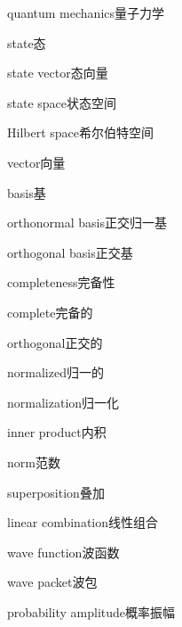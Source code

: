 \begin{multicols}{2}
\raggedright
\setlength{\parindent}{0pt}
\setlength{\parskip}{0.16em}
\linespread{1.02}\selectfont
quantum mechanics\hspace{0.9em}量子力学\par
state\hspace{0.9em}态\par
state vector\hspace{0.9em}态向量\par
state space\hspace{0.9em}状态空间\par
Hilbert space\hspace{0.9em}希尔伯特空间\par
vector\hspace{0.9em}向量\par
basis\hspace{0.9em}基\par
orthonormal basis\hspace{0.9em}正交归一基\par
orthogonal basis\hspace{0.9em}正交基\par
completeness\hspace{0.9em}完备性\par
complete\hspace{0.9em}完备的\par
orthogonal\hspace{0.9em}正交的\par
normalized\hspace{0.9em}归一的\par
normalization\hspace{0.9em}归一化\par
inner product\hspace{0.9em}内积\par
norm\hspace{0.9em}范数\par
superposition\hspace{0.9em}叠加\par
linear combination\hspace{0.9em}线性组合\par
wave function\hspace{0.9em}波函数\par
wave packet\hspace{0.9em}波包\par
probability amplitude\hspace{0.9em}概率振幅\par

\end{multicols}
